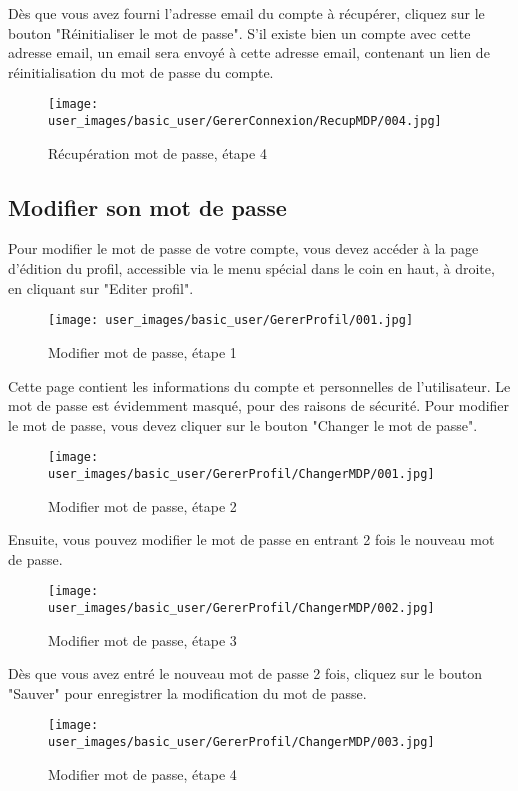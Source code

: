 Dès que vous avez fourni l'adresse email du compte à récupérer, cliquez sur le bouton "Réinitialiser le mot de passe". S'il existe bien un compte avec cette adresse email, un email sera envoyé à cette adresse email, contenant un lien de réinitialisation du mot de passe du compte.

\begin{figure}[H]
\centering
\texttt{[image: user\_images/basic\_user/GererConnexion/RecupMDP/004.jpg]}
\caption{Récupération mot de passe, étape 4}
\end{figure}

\subsection{Modifier son mot de passe}

Pour modifier le mot de passe de votre compte, vous devez accéder à la page d'édition du profil, accessible via le menu spécial dans le coin en haut, à droite, en cliquant sur "Editer profil".

\begin{figure}[H]
\centering
\texttt{[image: user\_images/basic\_user/GererProfil/001.jpg]}
\caption{Modifier mot de passe, étape 1}
\end{figure}

Cette page contient les informations du compte et personnelles de l'utilisateur. Le mot de passe est évidemment masqué, pour des raisons de sécurité. Pour modifier le mot de passe, vous devez cliquer sur le bouton "Changer le mot de passe".

\begin{figure}[H]
\centering
\texttt{[image: user\_images/basic\_user/GererProfil/ChangerMDP/001.jpg]}
\caption{Modifier mot de passe, étape 2}
\end{figure}

Ensuite, vous pouvez modifier le mot de passe en entrant 2 fois le nouveau mot de passe.

\begin{figure}[H]
\centering
\texttt{[image: user\_images/basic\_user/GererProfil/ChangerMDP/002.jpg]}
\caption{Modifier mot de passe, étape 3}
\end{figure}

Dès que vous avez entré le nouveau mot de passe 2 fois, cliquez sur le bouton "Sauver" pour enregistrer la modification du mot de passe.

\begin{figure}[H]
\centering
\texttt{[image: user\_images/basic\_user/GererProfil/ChangerMDP/003.jpg]}
\caption{Modifier mot de passe, étape 4}
\end{figure}

